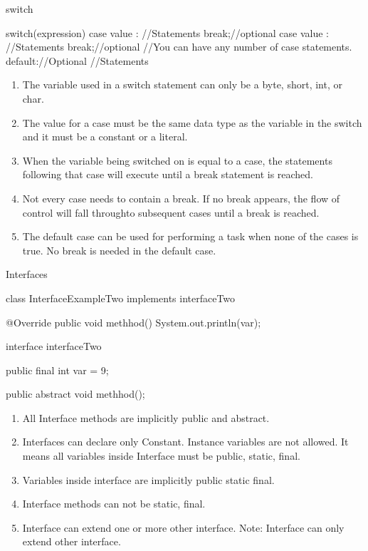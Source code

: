 \documentclass[11pt]{beamer}
\begin{document}
\begin{frame}{switch}

\begin{java}

switch(expression){
case value :
//Statements
break;//optional
case value :
//Statements
break;//optional
//You can have any number of case statements.
default://Optional
//Statements
}

\end{java}

\begin{enumerate}
\item The variable used in a switch statement can only be a byte, short, int, or char.
\item The value for a case must be the same data type as the variable in the switch and it must be a constant or a literal.
\item When the variable being switched on is equal to a case, the statements following that case will execute until a break statement is reached.
\item Not every case needs to contain a break. If no break appears, the flow of control will fall throughto subsequent cases until a break is reached.
\item The default
case can be used for performing a task when none of the cases is true. No break is needed in the default
case.
\end{enumerate}
\end{frame}


\begin{frame}{Interfaces}
\begin{java}
class InterfaceExampleTwo implements interfaceTwo {
 
    @Override
    public void methhod() {
        System.out.println(var);
    }
 }
 
interface interfaceTwo {
    public final int var = 9;
 
    public abstract void methhod();
}
\end{java}
\begin{enumerate}
\item All Interface methods are implicitly public and abstract.
\item Interfaces can declare only Constant. Instance variables are not allowed. It means all variables inside Interface must be public, static, final. 
\item Variables inside interface are implicitly public static final.
\item Interface methods can not be static, final.
\item Interface can extend one or more other interface. Note: Interface can only extend other interface.


\end{enumerate}

\end{frame}
\end{document}
